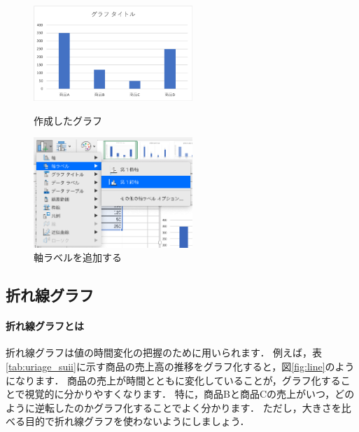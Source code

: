 \begin{figure}[tb]
    \begin{minipage}{0.5\hsize}
        \centering
        \includegraphics[width=6cm]{chap2/bar3.png}
        \caption{作成したグラフ}
        \label{fig:bar3}
    \end{minipage}
    \begin{minipage}{0.5\hsize}
        \centering
        \includegraphics[width=6cm]{chap2/bar_label.png}
        \caption{軸ラベルを追加する}
        \label{fig:bar_label}
    \end{minipage}
\end{figure}


\subsection{折れ線グラフ}

\paragraph{折れ線グラフとは}

折れ線グラフは値の時間変化の把握のために用いられます．
例えば，表\ref{tab:uriage_suii}に示す商品の売上高の推移をグラフ化すると，図\ref{fig:line}のようになります．
商品の売上が時間とともに変化していることが，グラフ化することで視覚的に分かりやすくなります．
特に，商品Bと商品Cの売上がいつ，どのように逆転したのかグラフ化することでよく分かります．
ただし，大きさを比べる目的で折れ線グラフを使わないようにしましょう．

